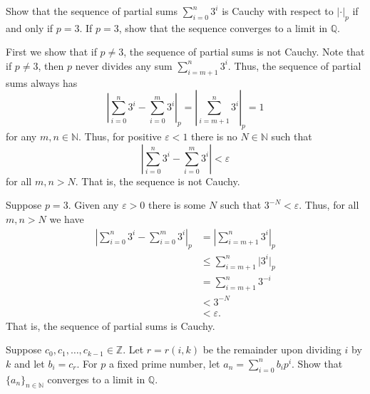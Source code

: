 \documentclass[12 pt, letterpaper]{hmcpset}
\begin{document}
\begin{problem}[(1)]
	Show that the sequence of partial sums $\sum_{i = 0}^{n} 3^{i}$ is Cauchy with respect to $\lvert \cdot \rvert_{p}$ if and only if $p = 3$. If $p = 3$, show that the sequence converges to a limit in $\mathbb{Q}$.
\end{problem}

\begin{solution}
	First we show that if $p \neq 3$, the sequence of partial sums is not Cauchy. Note that if $p \neq 3$, then $p$ never divides any sum $\sum_{i = m + 1}^{n} 3^{i}$. Thus, the sequence of partial sums always has
	\[
		\left \lvert \sum_{i = 0}^{n} 3^{i} - \sum_{i = 0}^{m} 3^{i} \right \rvert_{p} = \left \lvert \sum_{i = m + 1}^{n} 3^{i} \right \rvert_{p} = 1
	\]
	for any $m, n \in \mathbb{N}$. Thus, for positive $\varepsilon < 1$ there is no $N \in \mathbb{N}$ such that
	 \[
		\left \lvert \sum_{i = 0}^{n} 3^{i} - \sum_{i = 0}^{m} 3^{i} \right \rvert < \varepsilon
	\]
	for all $m, n > N$. That is, the sequence is not Cauchy.

	Suppose $p = 3$. Given any $\varepsilon > 0$ there is some $N$ such that $3^{-N} < \varepsilon$. Thus, for all $m, n > N$ we have
	\begin{align*}
		\left \lvert \sum_{i = 0}^{n} 3^{i} - \sum_{i = 0}^{m} 3^{i} \right \rvert_{p} & = \left \lvert \sum_{i = m + 1}^{n} 3^{i} \right \rvert_{p} \\
											   & \le \sum_{i = m + 1}^{n} \lvert 3^{i} \rvert_{p} \\
											   & = \sum_{i = m + 1}^{n} 3^{-i} \\
											   & < 3^{-N} \\
											   & < \varepsilon.
	\end{align*}
	That is, the sequence of partial sums is Cauchy.
\end{solution}

\pagebreak

\begin{problem}[(2)]
	Suppose $c_{0}, c_{1}, \dots, c_{k - 1} \in \mathbb{Z}$. Let $r = r(i, k)$ be the remainder upon dividing $i$ by $k$ and let $b_{i} = c_{r}$. For $p$ a fixed prime number, let $a_{n} = \sum_{i = 0}^{n} b_{i} p^{i}$. Show that $\{ a_{n} \}_{n \in \mathbb{N}}$ converges to a limit in $\mathbb{Q}$.
\end{problem}
\end{document}

